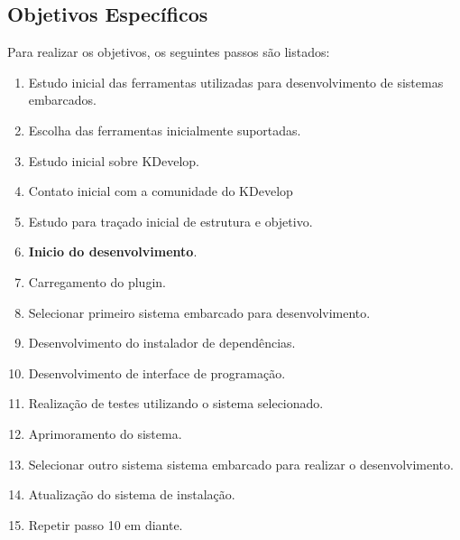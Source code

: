\iffalse
O objetivo geral deve responder as seguintes perguntas:
1) O que a sua organização deseja realizar com o Projeto?
2) Qual problema em especial se quer solucionar?
3) Que mudanças se quer alcançar?
4) Que diferença o projeto quer fazer?

Deve ser escrito em tempo infinitivo (por exemplo: ampliar, capacitar, entre outros) e redigido com claridade. O objetivo precisa ser alcançável, não pode ser genérico, de forma que o projeto não consiga resolver (ex: terminar com a fome no mundo). Por outro lado deve ser ousado, capaz de sinalizar mudanças mais profundas que poderão ser alcançadas pelo projeto a médio e longo prazo.}
\fi

\subsection{Objetivos Específicos}
\label{ss:objetivosespecificos}
Para realizar os objetivos, os seguintes passos são listados:
\begin{enumerate}
\item Estudo inicial das ferramentas utilizadas para desenvolvimento de sistemas embarcados.
\item Escolha das ferramentas inicialmente suportadas.
\item Estudo inicial sobre KDevelop.
\item Contato inicial com a comunidade do KDevelop%
\item Estudo para traçado inicial de estrutura e objetivo.
\item \textbf{Inicio do desenvolvimento}.
\item Carregamento do plugin.
\item Selecionar primeiro sistema embarcado para desenvolvimento.
\item Desenvolvimento do instalador de dependências.
\item Desenvolvimento de interface de programação.
\item Realização de testes utilizando o sistema selecionado.
\item Aprimoramento do sistema.
\item Selecionar outro sistema sistema embarcado para realizar o desenvolvimento.
\item Atualização do sistema de instalação.
\item Repetir passo 10 em diante.
\end{enumerate}

